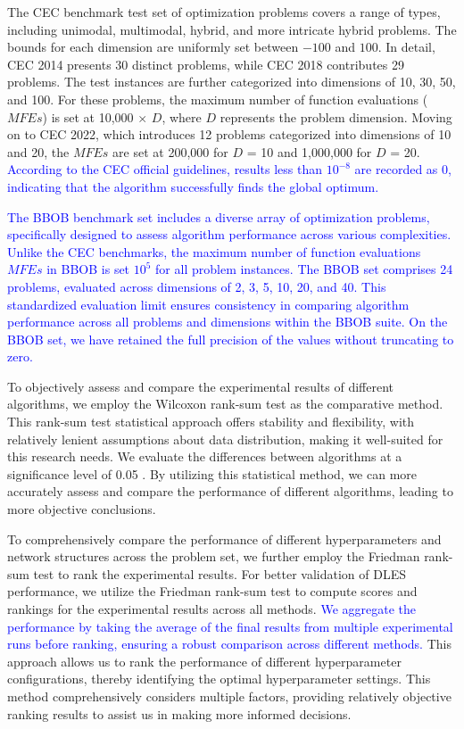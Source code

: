 \documentclass[journal,twoside]{IEEEtran}
\begin{document}
The CEC benchmark test set of optimization problems covers a range of types, including unimodal, multimodal, hybrid, and more intricate hybrid problems. The bounds for each dimension are uniformly set between $-100$ and $100$. In detail, CEC 2014 presents 30 distinct problems, while CEC 2018 contributes 29 problems. The test instances are further categorized into dimensions of 10, 30, 50, and 100. For these problems, the maximum number of function evaluations ($M\!F\!E\!s$) is set at 10,000 $\times$ $D$, where $D$ represents the problem dimension. Moving on to CEC 2022, which introduces 12 problems categorized into dimensions of 10 and 20, the $M\!F\!E\!s$ are set at 200,000 for $D$ = 10 and 1,000,000 for $D$ = 20. \textcolor{blue}{According to the CEC official guidelines, results less than $10^{-8}$ are recorded as 0, indicating that the algorithm successfully finds the global optimum.}

\textcolor{blue}{The BBOB benchmark set includes a diverse array of optimization problems, specifically designed to assess algorithm performance across various complexities. Unlike the CEC benchmarks, the maximum number of function evaluations $M\!F\!E\!s$ in BBOB is set  $10^{5}$ for all problem instances. The BBOB set comprises 24 problems, evaluated across dimensions of 2, 3, 5, 10, 20, and 40. This standardized evaluation limit ensures consistency in comparing algorithm performance across all problems and dimensions within the BBOB suite. On the BBOB set, we have retained the full precision of the values without truncating to zero.}

To objectively assess and compare the experimental results of different algorithms, we employ the Wilcoxon rank-sum test as the comparative method. This rank-sum test statistical approach offers stability and flexibility, with relatively lenient assumptions about data distribution, making it well-suited for this research needs. We evaluate the differences between algorithms at a significance level of 0.05 \cite{dao2022wilcoxon}. By utilizing this statistical method, we can more accurately assess and compare the performance of different algorithms, leading to more objective conclusions.

To comprehensively compare the performance of different hyperparameters and network structures across the problem set, we further employ the Friedman rank-sum test \cite{carrasco2020recent} to rank the experimental results. For better validation of DLES performance, we utilize the Friedman rank-sum test to compute scores and rankings for the experimental results across all methods. \textcolor{blue}{We aggregate the performance by taking the average of the final results from multiple experimental runs before ranking, ensuring a robust comparison across different methods.} This approach allows us to rank the performance of different hyperparameter configurations, thereby identifying the optimal hyperparameter settings. This method comprehensively considers multiple factors, providing relatively objective ranking results to assist us in making more informed decisions.
\end{document}
